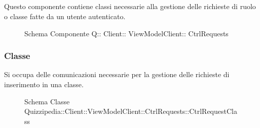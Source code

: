 \subsection{}
Questo componente contiene classi necessarie alla gestione delle richieste di ruolo o classe fatte da un utente autenticato.
\begin{figure}[H]
\centering
\noindent{}
\caption[Schema Componente Quizzipedia::Client::ViewModelClient::CtrlRequests]{Schema Componente Q:: Client:: ViewModelClient:: CtrlRequests}
\end{figure}
\subsubsection{Classe }
Si occupa delle comunicazioni necessarie per la gestione delle richieste di inserimento in una classe.
\begin{figure}[H]
\centering
\noindent{}
\caption[Schema Classe CtrlRequestClass]{Schema Classe Quizzipedia::Client::ViewModelClient::CtrlRequests::CtrlRequestClass}
\end{figure}
